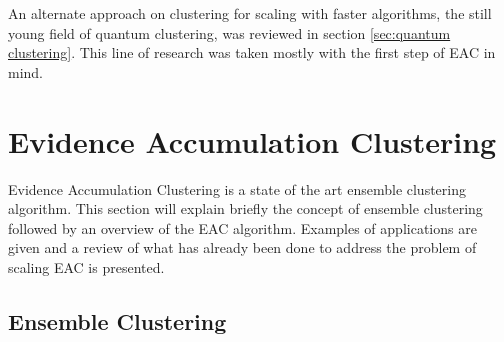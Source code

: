 An alternate approach on clustering for scaling with faster algorithms, the still young field of quantum clustering, was reviewed in section \ref{sec:quantum clustering}.
This line of research was taken mostly with the first step of EAC in mind.







%
%

\section{Evidence Accumulation Clustering}
\label{sec:eac}

Evidence Accumulation Clustering is a state of the art ensemble clustering algorithm.
This section will explain briefly the concept of ensemble clustering followed by an overview of the EAC algorithm.
Examples of applications are given and a review of what has already been done to address the problem of scaling EAC is presented.


\subsection{Ensemble Clustering}

